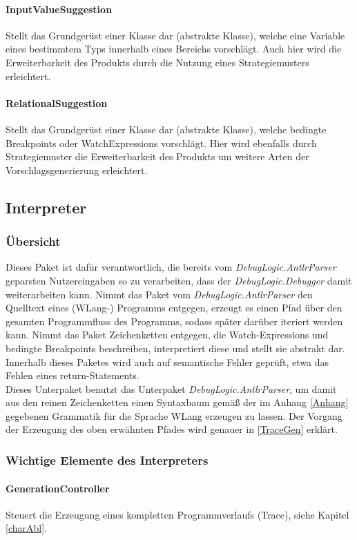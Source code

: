 \documentclass[parskip=full]{scrartcl}
\begin{document}
\paragraph{InputValueSuggestion}
Stellt das Grundgerüst einer Klasse dar (abstrakte Klasse), welche eine Variable eines bestimmtem Typs innerhalb eines Bereichs vorschlägt. Auch hier wird die Erweiterbarkeit des Produkts durch die Nutzung eines Strategiemusters erleichtert.
\paragraph{RelationalSuggestion}
Stellt das Grundgerüst einer Klasse dar (abstrakte Klasse), welche bedingte Breakpoints oder WatchExpressions vorschlägt. Hier wird ebenfalls durch Strategiemuster die Erweiterbarkeit des Produkts um weitere Arten der Vorschlagsgenerierung erleichtert.


\subsection{Interpreter}
\subsubsection{Übersicht}
Dieses Paket ist dafür verantwortlich, die bereits vom \textit{DebugLogic.AntlrParser}  geparsten Nutzereingaben so zu verarbeiten, dass der \textit{DebugLogic.Debugger} damit weiterarbeiten kann. Nimmt das Paket vom \textit{DebugLogic.AntlrParser} den Quelltext eines (WLang-) Programms entgegen, erzeugt es einen Pfad über den gesamten Programmfluss des Programms, sodass später darüber iteriert werden kann. Nimmt das Paket Zeichenketten entgegen, die Watch-Expressions und bedingte Breakpoints beschreiben, interpretiert diese und stellt sie abstrakt dar.
Innerhalb dieses Paketes wird auch auf semantische Fehler geprüft, etwa das Fehlen eines return-Statements.\\
Dieses Unterpaket benutzt das Unterpaket \textit{DebugLogic.AntlrParser}, um damit aus den reinen Zeichenketten einen Syntaxbaum gemäß der im Anhang \ref{Anhang} gegebenen Grammatik für die Sprache WLang erzeugen zu lassen.
Der Vorgang der Erzeugung des oben erwähnten Pfades wird genauer in \ref{TraceGen} erklärt.
\subsubsection{Wichtige Elemente des Interpreters}
\paragraph{GenerationController}
Steuert die Erzeugung eines kompletten Programmverlaufs (Trace), siehe Kapitel \ref{charAbl}.
\end{document}
